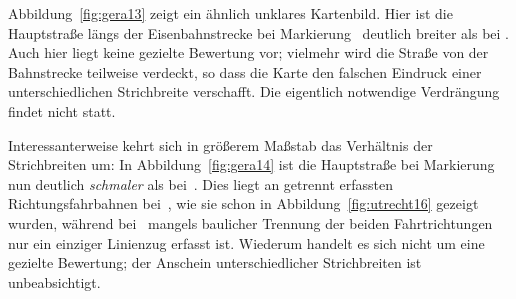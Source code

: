 \documentclass[../main/thesis.tex]{subfiles}
\begin{document}
Abbildung~\ref{fig:gera13} zeigt ein ähnlich unklares Kartenbild.
Hier ist die Hauptstraße längs der Eisenbahnstrecke bei Markierung~ deutlich breiter als bei .
Auch hier liegt keine gezielte Bewertung vor; vielmehr wird die Straße von der Bahnstrecke teilweise verdeckt, so dass die Karte den falschen Eindruck einer unterschiedlichen Strichbreite verschafft.
Die eigentlich notwendige Verdrängung findet nicht statt.


Interessanterweise kehrt sich in größerem Maßstab das Verhältnis der Strichbreiten um:
In Abbildung~\ref{fig:gera14} ist die Hauptstraße bei Markierung~ nun deutlich \emph{schmaler} als bei~.
Dies liegt an getrennt erfassten Richtungsfahrbahnen bei~, wie sie schon in Abbildung~\ref{fig:utrecht16} gezeigt wurden, während bei~ mangels baulicher Trennung der beiden Fahrtrichtungen nur ein einziger Linienzug erfasst ist.
Wiederum handelt es sich nicht um eine gezielte Bewertung; der Anschein unterschiedlicher Strichbreiten ist unbeabsichtigt.



\end{document}
